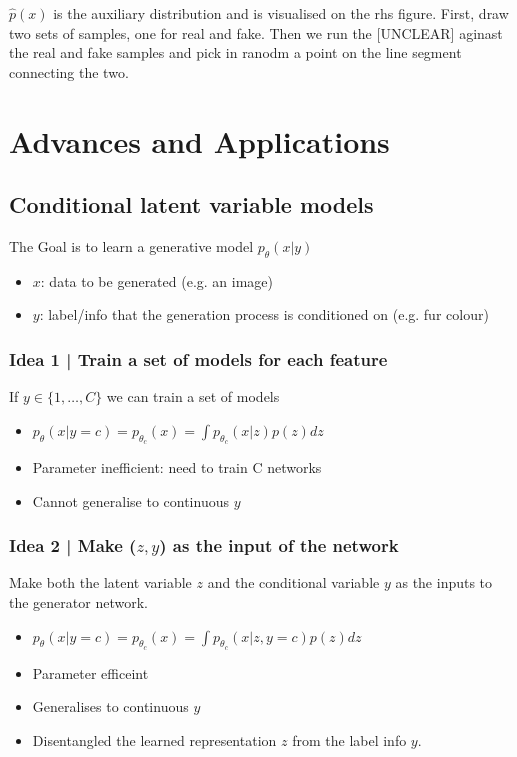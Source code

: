 \documentclass[11pt]{article}
\begin{document}
$\hat p (x)$ is the auxiliary distribution and is visualised on the rhs figure. First, draw two sets of samples, one for real and fake. Then we run the [UNCLEAR] aginast the real and fake samples and pick in ranodm a point on the line segment connecting the two. 

\section{Advances and Applications}

\subsection{Conditional latent variable models}

The Goal is to learn a generative model $p_\theta(x|y)$

\begin{itemize}
    \item $x$: data to be generated (e.g. an image)
    \item $y$: label/info that the generation process is conditioned on (e.g. fur colour)
\end{itemize}

\subsubsection{Idea 1 | Train a set of models for each feature}

If $y\in \{1, \dots, C\}$ we can train a set of models

\begin{itemize}
    \item $p_\theta(x|y=c)=p_{\theta_c}(x)=\int p_{\theta_c}(x|z)p(z)dz$
    \item Parameter inefficient: need to train C networks
    \item Cannot generalise to continuous $y$
\end{itemize}

\subsubsection{Idea 2 | Make ($z,y$) as the input of the network}

Make both the latent variable $z$ and the conditional variable $y$ as the inputs to the generator network.

\begin{itemize}
    \item $p_\theta(x|y=c)=p_{\theta_c}(x)=\int p_{\theta_c}(x|z,y=c)p(z)dz$
    \item Parameter efficeint
    \item Generalises to continuous $y$
    \item Disentangled the learned representation $z$ from the label info $y$.
\end{itemize}
\end{document}
